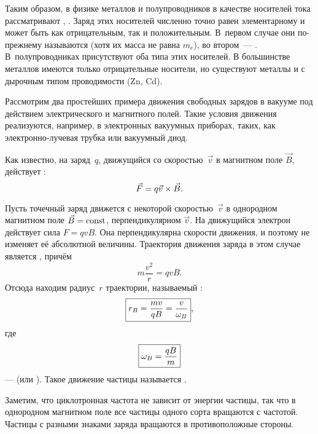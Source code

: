 Таким образом, в физике металлов и полупроводников в качестве носителей тока
рассматривают ,
.
Заряд этих носителей численно точно равен элементарному и может быть как
отрицательным, так и положительным. В~первом случае они по-прежнему называются
 (хотя их масса не равна $m_e$),
во втором~--- . В~полупроводниках присутствуют оба типа этих
носителей. В большинстве металлов имеются только отрицательные носители, но
существуют металлы и с дырочным типом проводимости (Zn, Cd).



Рассмотрим два простейших примера движения свободных зарядов в вакууме под
действием электрического и магнитного полей. Такие условия движения реализуются,
например, в электронных вакуумных приборах, таких, как электронно-лучевая
трубка или вакуумный диод.


Как известно, на заряд~$q$, движущийся со скоростью~$\vec{v}$ в магнитном поле
$\vec{B}$, действует :
\begin{equation*}
    \eqmark{3.1}
    \vec{F}=q{\vec{v}}\times{\vec{B}}.
\end{equation*}

Пусть точечный заряд движется с некоторой скоростью~$\vec{v}$ в
однородном магнитном поле $\vec{B}=\mathrm{const}$, перпендикулярном $\vec{v}$.
На движущийся электрон действует сила $F=qvB$. Она перпендикулярна
скорости движения, и поэтому не изменяет её абсолютной величины. Траектория
движения заряда в этом случае является , причём
\[
m\frac{v^2}{r}=qvB.
\]
Отсюда находим радиус~$r$ траектории, называемый :
\begin{equation}
    \eqmark{3.2}
    \boxed{r_B =\frac{m v}{qB}= \frac{v}{\omega_B}},
\end{equation}
где
\begin{equation}
    \eqmark{omega-B}
    \boxed{\omega_B=\frac{qB}{m}}
\end{equation}
---  (или ).
Такое движение частицы называется .

Заметим, что циклотронная частота не зависит от энергии частицы, так
что в однородном магнитном поле все частицы одного сорта вращаются с
 частотой. Частицы с разными знаками заряда вращаются в
противоположные стороны.

